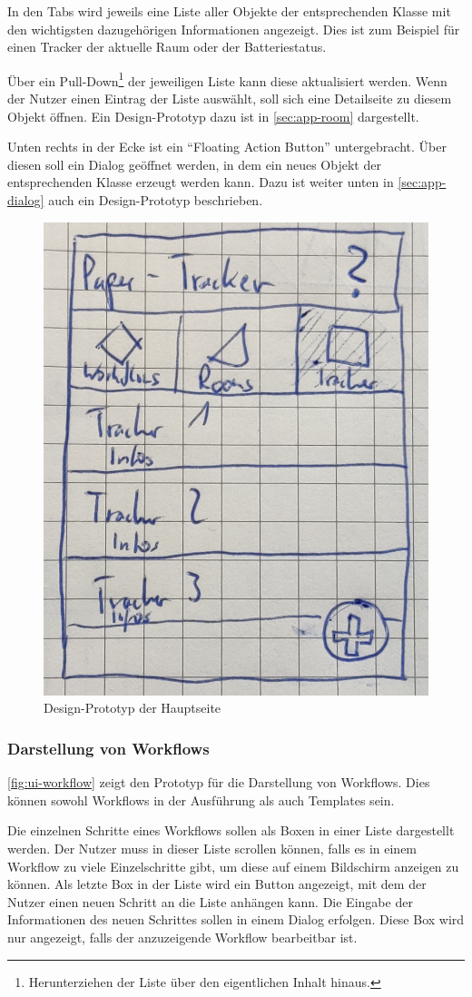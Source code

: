 In den Tabs wird jeweils eine Liste aller Objekte der entsprechenden Klasse mit den wichtigsten dazugehörigen Informationen angezeigt.
Dies ist zum Beispiel für einen Tracker der aktuelle Raum oder der Batteriestatus.

Über ein Pull-Down\footnote{Herunterziehen der Liste über den eigentlichen Inhalt hinaus.} der jeweiligen Liste kann diese aktualisiert werden.
Wenn der Nutzer einen Eintrag der Liste auswählt, soll sich eine Detailseite zu diesem Objekt öffnen.
Ein Design-Prototyp dazu ist in \autoref{sec:app-room} dargestellt.

Unten rechts in der Ecke ist ein \enquote{Floating Action Button} untergebracht.
Über diesen soll ein Dialog geöffnet werden, in dem ein neues Objekt der entsprechenden Klasse erzeugt werden kann.
Dazu ist weiter unten in \autoref{sec:app-dialog} auch ein Design-Prototyp beschrieben.

\begin{figure}[h!tbp]
	\includegraphics[width=.4\textwidth]{images/ui-prototype/main_page.jpg}
	\centering
	\caption{Design-Prototyp der Hauptseite}
	\label{fig:ui-main-page}
\end{figure}

\FloatBarrier

\subsubsection{Darstellung von Workflows}

\autoref{fig:ui-workflow} zeigt den Prototyp für die Darstellung von Workflows.
Dies können sowohl Workflows in der Ausführung als auch Templates sein.

Die einzelnen Schritte eines Workflows sollen als Boxen in einer Liste dargestellt werden.
Der Nutzer muss in dieser Liste scrollen können, falls es in einem Workflow zu viele Einzelschritte
gibt, um diese auf einem Bildschirm anzeigen zu können.
Als letzte Box in der Liste wird ein Button angezeigt, mit dem der Nutzer einen neuen Schritt an die Liste anhängen kann.
Die Eingabe der Informationen des neuen Schrittes sollen in einem Dialog erfolgen.
Diese Box wird nur angezeigt, falls der anzuzeigende Workflow bearbeitbar ist.

